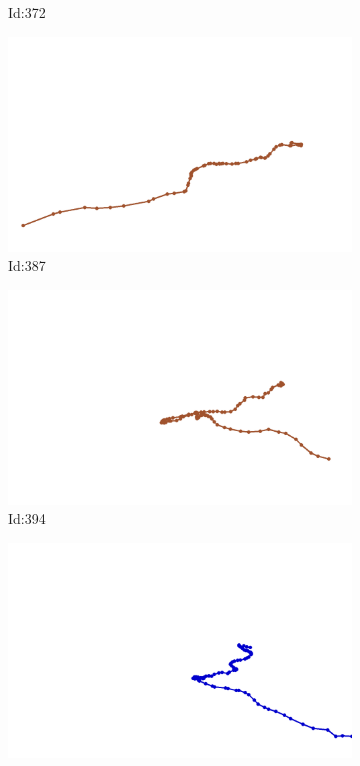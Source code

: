 \documentclass[12pt,twoside]{report}
\begin{document}
\begin{figure}
\begin{subfigure}[b]{0.20\textwidth}
\caption{Id:372}
\end{subfigure}
\begin{subfigure}[b]{0.20\textwidth}
\centering
\includegraphics[width=\textwidth]{../trajectories/387.png}
\caption{Id:387}
\end{subfigure}
\begin{subfigure}[b]{0.20\textwidth}
\centering
\includegraphics[width=\textwidth]{../trajectories/394.png}
\caption{Id:394}
\end{subfigure}
\begin{subfigure}[b]{0.20\textwidth}
\centering
\includegraphics[width=\textwidth]{../trajectories/396.png}

\end{subfigure}
\end{figure}
\end{document}
